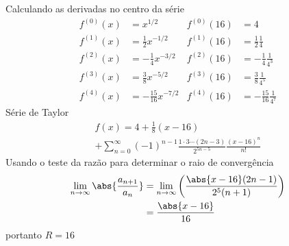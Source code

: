 \begin{exercises}
\begin{exercise}
\begin{answer}
\begin{alphalist}
  \item Calculando as derivadas no centro da série
  \begin{align*}
  	f^{(0)}(x) & = x^{1/2}                  & f^{(0)}(16) & = 4                            \\
  	f^{(1)}(x) & =   \frac{1}{2} x^{-1/2}   & f^{(1)}(16) & =  \frac{1}{2}   \frac{1}{4}   \\
  	f^{(2)}(x) & = - \frac{1}{4} x^{-3/2}   & f^{(2)}(16) & = -\frac{1}{4}   \frac{1}{4^3} \\
  	f^{(3)}(x) & =   \frac{3}{8} x^{-5/2}   & f^{(3)}(16) & =  \frac{3}{8}   \frac{1}{4^5} \\
  	f^{(4)}(x) & = - \frac{15}{16} x^{-7/2} & f^{(4)}(16) & = -\frac{15}{16} \frac{1}{4^7}
  \end{align*}
  Série de Taylor
  \begin{multline*}
  	f(x) = 4 + \frac{1}{8}(x-16) \\
  	+ \sum_{n=0}^\infty (-1)^{n-1}
      \frac{1\cdot 3\cdots (2n-3)}{2^{5n-5}}
      \frac{(x-16)^n}{n!}
  \end{multline*}
  Usando o teste da razão para determinar o raio de convergência
  \begin{align*}
    \lim_{n\to\infty}\abs{\frac{a_{n+1}}{a_n}}
      & = \lim_{n\to\infty}\left( \frac{\abs{x-16}(2n-1)}{2^5(n+1)} \right) \\
      & = \frac{\abs{x-16}}{16}
  \end{align*}
  portanto $R=16$
  \end{alphalist}
\end{answer}
\end{exercise}


\end{exercises}
